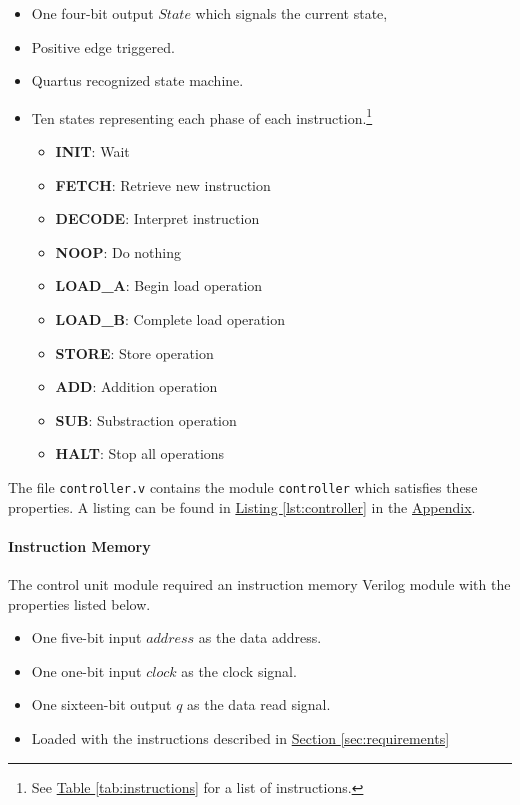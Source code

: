 \begin{itemize}
    \item One four-bit output $State$ which signals the current state,
    \item Positive edge triggered.
    \item Quartus recognized state machine.
    \item Ten states representing each phase of each instruction.\footnote{%
        See \hyperref[tab:instructions]{Table \ref*{tab:instructions}} for a list of instructions.
    }
    \begin{itemize}
        \item \textbf{INIT}: Wait
        \item \textbf{FETCH}: Retrieve new instruction
        \item \textbf{DECODE}: Interpret instruction
        \item \textbf{NOOP}: Do nothing
        \item \textbf{LOAD\_A}: Begin load operation
        \item \textbf{LOAD\_B}: Complete load operation
        \item \textbf{STORE}: Store operation
        \item \textbf{ADD}: Addition operation
        \item \textbf{SUB}: Substraction operation
        \item \textbf{HALT}: Stop all operations
    \end{itemize}
\end{itemize}

The file \verb|controller.v| contains the module \verb|controller| which satisfies these properties.
A listing can be found in \hyperref[lst:controller]{Listing \ref*{lst:controller}} in the \hyperref[sec:appendix]{Appendix}.

\paragraph{Instruction Memory} \label{par:imem}

The control unit module required an instruction memory Verilog module with the properties listed below.

\begin{itemize}
    \item One five-bit input $address$ as the data address.
    \item One one-bit input $clock$ as the clock signal.
    \item One sixteen-bit output $q$ as the data read signal.
    \item Loaded with the instructions described in \hyperref[sec:requirements]{Section \ref*{sec:requirements}}
\end{itemize}

